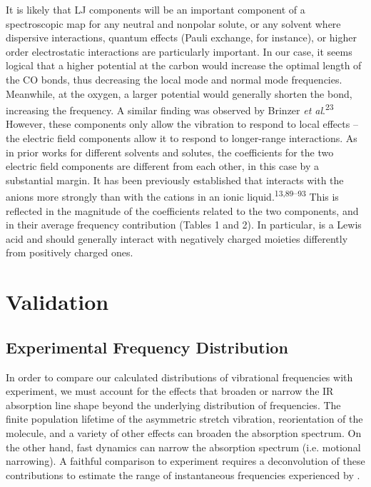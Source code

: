\documentclass[]{article}
\begin{document}
It is likely that LJ components will be an important component of a spectroscopic map for any neutral and nonpolar solute, or any solvent where dispersive interactions, quantum effects (Pauli exchange, for instance), or higher order electrostatic interactions are particularly important. In our case, it seems logical that a higher potential at the carbon would increase the optimal length of the CO bonds, thus decreasing the local mode and normal mode frequencies. Meanwhile, at the oxygen, a larger potential would generally shorten the bond, increasing the frequency. A similar finding was observed by Brinzer \emph{et al}.\textsuperscript{23} However, these components only allow the  vibration to respond to local effects -- the electric field components allow it to respond to longer-range interactions. As in prior works for different solvents and solutes, the coefficients for the two electric field components are different from each other, in this case by a substantial margin. It has been previously established that  interacts with the anions more strongly than with the cations in an ionic liquid.\textsuperscript{13,89--93} This is reflected in the magnitude of the coefficients related to the two components, and in their average frequency contribution (Tables 1 and 2). In particular,  is a Lewis acid and should generally interact with negatively charged moieties differently from positively charged ones.

\section{Validation}
\label{paper_03:sec:V}

\subsection{Experimental Frequency Distribution}
\label{paper_03:ssec:V-A}

In order to compare our calculated distributions of  vibrational frequencies with experiment, we must account for the effects that broaden or narrow the IR absorption line shape beyond the underlying distribution of frequencies. The finite population lifetime of the asymmetric stretch vibration, reorientation of the  molecule, and a variety of other effects can broaden the absorption spectrum. On the other hand, fast dynamics can narrow the absorption spectrum (i.e. motional narrowing). A faithful comparison to experiment requires a deconvolution of these contributions to estimate the range of instantaneous frequencies experienced by .
\end{document}
